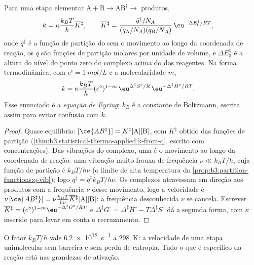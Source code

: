 \begin{theorem}\label{thm:b3:rate-theories:eyring}
Para uma etapa elementar $\mathrm{A + B} \to \mathrm{AB}^{\ddagger} \to$ produtos,
\[
  k = \kappa\frac{k_BT}{h}\overline{K}{}^{\ddagger}, \qquad
  \overline{K}{}^{\ddagger} = \frac{\bar q^{\ddagger}/N_A}{(q_{\mathrm A}/N_A)(q_{\mathrm B}/N_A)}\,\eu^{-\Delta E_0^{\ddagger}/RT},
\]
onde $\bar q^{\ddagger}$ é a função de partição do  sem o movimento ao
longo da coordenada de reação, os $q$ são funções de partição molares por unidade
de volume, e $\Delta E_0^{\ddagger}$ é a altura do nível do ponto zero do complexo acima
do dos reagentes. Na forma termodinâmica, com $c^\circ = \qty{1}{mol/L}$ e a
molecularidade $m$,
\[
  k = \kappa\frac{k_BT}{h}(c^\circ)^{1-m}\,\eu^{\Delta^{\ddagger}S^\circ/R}\,\eu^{-\Delta^{\ddagger}H^\circ/RT}.
\]
Esse enunciado é a \emph{equação de Eyring}; $k_B$ é a
constante de Boltzmann, escrita assim para evitar confusão com $k$.
\end{theorem}

\begin{proof}
Quase equilíbrio: $[\ce{AB^{\ddagger}}] = K^{\ddagger}[\mathrm A][\mathrm B]$, com $K^{\ddagger}$ obtido das funções de partição
(\cref{thm:b3:statistical-thermo-applied:k-from-q}, escrito com concentrações).
Das vibrações do complexo, uma é o movimento ao longo da coordenada de reação:
uma vibração muito frouxa de frequência $\nu \ll k_BT/h$, cuja função de partição
é $k_BT/h\nu$ (o limite de alta temperatura da
\cref{prop:b3:partition-functions:q-vib}); logo $q^{\ddagger} = \bar q^{\ddagger}k_BT/h\nu$. Os
complexos atravessam em direção aos produtos com a frequência $\nu$ desse movimento,
logo a velocidade é $\nu[\ce{AB^{\ddagger}}] = \nu\frac{k_BT}{h\nu}\overline{K}{}^{\ddagger}[\mathrm A][\mathrm B]$: a frequência desconhecida $\nu$ se cancela. Escrever
$\overline{K}{}^{\ddagger} = (c^\circ)^{1-m}\eu^{-\Delta^{\ddagger}G^\circ/RT}$ e $\Delta^{\ddagger}G^\circ = \Delta^{\ddagger}H^\circ - T\Delta^{\ddagger}S^\circ$ dá a
segunda forma, com $\kappa$ inserido para levar em conta o recruzamento.
\end{proof}

O fator $k_BT/h$ vale \qty{6.2e12}{s^{-1}} a \qty{298}{K}: a velocidade de uma etapa
unimolecular sem barreira e sem perda de entropia. Tudo o que é específico da
reação está nas grandezas de ativação.

